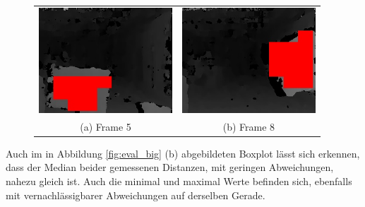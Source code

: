 	\begin{figure}[h]
		\centering
		\begin{tabular}{cc}
		\includegraphics[width=5cm]{img/evaluation/_test_5_disparity}&
		\includegraphics[width=5cm]{img/evaluation/_test_8_disparity}\\
		(a) Frame 5 &  (b) Frame 8
		\end{tabular}
		\caption{}
	    \label{fig:eval_big_fails}
	\end{figure}

	\noindent
	Auch im in Abbildung \ref{fig:eval_big} (b) abgebildeten Boxplot lässt sich erkennen, dass der Median beider gemessenen Distanzen, mit geringen Abweichungen, nahezu gleich ist. Auch die minimal und maximal Werte befinden sich, ebenfalls mit vernachlässigbarer Abweichungen auf derselben Gerade.\\

